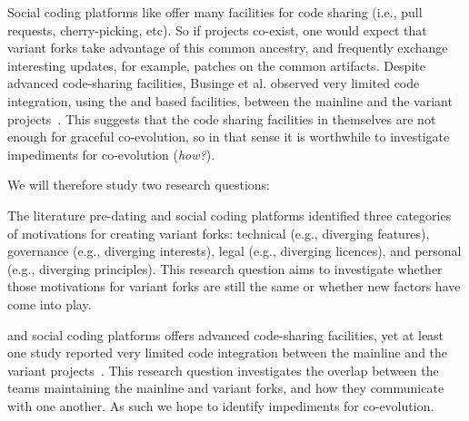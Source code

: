 Social coding platforms like \gh offer many facilities for code sharing (i.e., pull requests, cherry-picking, etc).
So if projects co-exist, one would expect that variant forks take advantage of this common ancestry, and frequently exchange interesting updates, for example, patches on the common artifacts.
Despite advanced code-sharing facilities, Businge et al. observed very limited code integration, using the \git and \gh based facilities, between the mainline and the variant projects~\cite{businge:emse:2021}.
This suggests that the code sharing facilities in themselves are not enough for graceful co-evolution, so in that sense it is worthwhile to investigate impediments for co-evolution (\textit{how?}).


\noindent
We will therefore study two research questions:

\textit{\textbf{\RQOne}}
The literature pre-dating \git and social coding platforms identified three categories of motivations for creating variant forks: technical (e.g., diverging features), governance (e.g., diverging interests), legal (e.g., diverging licences), and personal (e.g., diverging principles).
This research question aims to investigate whether those motivations for variant forks are still the same or whether new factors have come into play. 

\textit{\textbf{\RQTwo}}
\git and social coding platforms offers advanced code-sharing facilities, yet at least one study reported very limited code integration between the mainline and the variant projects~\cite{businge:emse:2021}.
This research question investigates the overlap between the teams maintaining the mainline and variant forks, and how they communicate with one another.
As such we hope to identify impediments for co-evolution.


